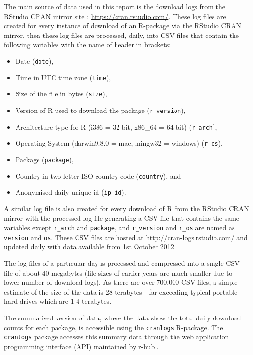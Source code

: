 \documentclass[
]{book}
\providecommand{\tightlist}{%
  \setlength{\itemsep}{0pt}\setlength{\parskip}{0pt}}
\begin{document}
The main source of data used in this report is the download logs from the RStudio CRAN mirror site : \url{https://cran.rstudio.com/}. These log files are created for every instance of download of an R-package via the RStudio CRAN mirror, then these log files are processed, daily, into CSV files that contain the following variables with the name of header in brackets:

\begin{itemize}
\tightlist
\item
  Date (\texttt{date}),
\item
  Time in UTC time zone (\texttt{time}),
\item
  Size of the file in bytes (\texttt{size}),
\item
  Version of R used to download the package (\texttt{r\_version}),
\item
  Architecture type for R (i386 = 32 bit, x86\_64 = 64 bit) (\texttt{r\_arch}),
\item
  Operating System (darwin9.8.0 = mac, mingw32 = windows) (\texttt{r\_os}),
\item
  Package (\texttt{package}),
\item
  Country in two letter ISO country code (\texttt{country}), and
\item
  Anonymised daily unique id (\texttt{ip\_id}).
\end{itemize}

A similar log file is also created for every download of R from the RStudio CRAN mirror with the processed log file generating a CSV file that contains the same variables except \texttt{r\_arch} and \texttt{package}, and \texttt{r\_version} and \texttt{r\_os} are named as \texttt{version} and \texttt{os}. These CSV files are hosted at \url{http://cran-logs.rstudio.com/} and updated daily with data available from 1st October 2012.

The log files of a particular day is processed and compressed into a single CSV file of about 40 megabytes (file sizes of earlier years are much smaller due to lower number of download logs). As there are over 700,000 CSV files, a simple estimate of the size of the data is 28 terabytes - far exceeding typical portable hard drives which are 1-4 terabytes.

The summarised version of data, where the data show the total daily download counts for each package, is accessible using the \texttt{cranlogs} R-package. The \texttt{cranlogs} package accesses this summary data through the web application programming interface (API) maintained by r-hub \autocite{rhub}.
\end{document}
